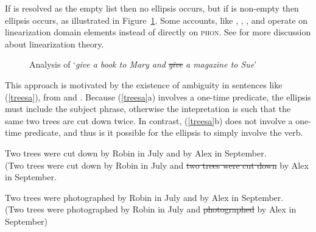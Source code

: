 \documentclass[output=paper]{langsci/langscibook}
\begin{document}
\noindent
If  is resolved as the empty list then no ellipsis occurs, but if  is non-empty then ellipsis occurs, as illustrated in Figure~\ref{lpe}. 
Some accounts, like  \citet{yatabe01}, \citet{Crysmann:04}, \citet{Beavers}, and \citet{chaveslp} operate on
linearization domain elements instead of directly on \textsc{phon}.  
See  for more discussion about linearization theory.


\begin{figure}[ht]
    \centering
    

    \caption{Analysis of `\emph{give a book to Mary and} \sout{\emph{give}} \emph{a magazine to Sue}'}\label{lpe}
\end{figure}

\noindent
This approach is motivated by the existence of ambiguity in 
sentences like (\ref{treesa}), from \citet{Beavers} and \citet{chaves06}. Because (\ref{treesa}a) involves a one-time predicate, the ellipsis must include the subject phrase, otherwise
the intepretation is such that the same two trees are cut down twice. In contrast,  (\ref{treesa}b) does not involve a one-time
predicate, and thus is it possible for the ellipsis to simply
involve the verb.


\begin{exe}
\ex 
\begin{xlista}
\ex Two trees were cut down by Robin in July and by Alex in September.\\
(Two trees were cut down by Robin in July and \sout{two trees were cut down} by Alex in September.

\ex Two trees were photographed by Robin in July and by Alex in September.\\
(Two trees were photographed by Robin in July and \sout{photographed} by Alex in September)
\end{xlista}\label{treesa}
\end{exe}
\end{document}
